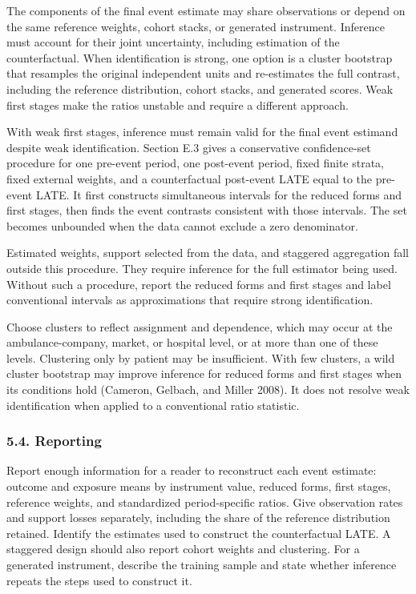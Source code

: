 \documentclass[
  11pt,
]{article}
\begin{document}
The components of the final event estimate may share observations or
depend on the same reference weights, cohort stacks, or generated
instrument. Inference must account for their joint uncertainty,
including estimation of the counterfactual. When identification is
strong, one option is a cluster bootstrap that resamples the original
independent units and re-estimates the full contrast, including the
reference distribution, cohort stacks, and generated scores. Weak first
stages make the ratios unstable and require a different approach.

With weak first stages, inference must remain valid for the final event
estimand despite weak identification. Section E.3 gives a conservative
confidence-set procedure for one pre-event period, one post-event
period, fixed finite strata, fixed external weights, and a
counterfactual post-event LATE equal to the pre-event LATE. It first
constructs simultaneous intervals for the reduced forms and first
stages, then finds the event contrasts consistent with those intervals.
The set becomes unbounded when the data cannot exclude a zero
denominator.

Estimated weights, support selected from the data, and staggered
aggregation fall outside this procedure. They require inference for the
full estimator being used. Without such a procedure, report the reduced
forms and first stages and label conventional intervals as
approximations that require strong identification.

Choose clusters to reflect assignment and dependence, which may occur at
the ambulance-company, market, or hospital level, or at more than one of
these levels. Clustering only by patient may be insufficient. With few
clusters, a wild cluster bootstrap may improve inference for reduced
forms and first stages when its conditions hold (Cameron, Gelbach, and
Miller 2008). It does not resolve weak identification when applied to a
conventional ratio statistic.

\hypertarget{reporting}{%
\subsubsection{5.4. Reporting}\label{reporting}}

Report enough information for a reader to reconstruct each event
estimate: outcome and exposure means by instrument value, reduced forms,
first stages, reference weights, and standardized period-specific
ratios. Give observation rates and support losses separately, including
the share of the reference distribution retained. Identify the estimates
used to construct the counterfactual LATE. A staggered design should
also report cohort weights and clustering. For a generated instrument,
describe the training sample and state whether inference repeats the
steps used to construct it.
\end{document}
